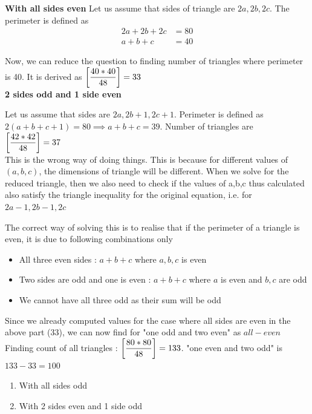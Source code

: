\textbf{With all sides even}
Let us assume that sides of triangle are $2a,2b,2c$. The perimeter is defined as
\begin{align*}
    2a + 2b + 2c &= 80 \\
    a + b + c &= 40
\end{align*}

Now, we can reduce the question to finding number of triangles where perimeter is 40. It is derived as $\left [ \dfrac{40 * 40}{48} \right ] = 33$ \\

\textbf{2 sides odd and 1 side even}

\begin{WARNING}
    Let us assume that sides are $2a,2b+1,2c+1$. Perimeter is defined as $2(a+b+c+1) = 80 \implies a+b+c = 39$. Number of triangles are $\left [ \dfrac{42 * 42}{48} \right ] = 37$ \\

    This is the wrong way of doing things. This is because for different values of $(a,b,c)$, the dimensions of triangle will be different. When we solve for the reduced triangle, then we also need to check if the values of a,b,c thus calculated also satisfy the triangle inequality for the original equation, i.e. for $2a-1, 2b-1, 2c$
\end{WARNING}

The correct way of solving this is to realise that if the perimeter of a triangle is even, it is due to following combinations only
\begin{itemize}
    \item All three even sides : $a + b + c$ where $a,b,c$ is even
    \item Two sides are odd and one is even : $a + b +c$ where $a$ is even and $b,c$ are odd
    \item We cannot have all three odd as their sum will be odd
\end{itemize}

Since we already computed values for the case where all sides are even in the above part (33), we can now find for "one odd and two even" as $all - even$ \\

Finding count of all triangles : $\left [ \dfrac{80 * 80}{48} \right ] = 133$. "one even and two odd" is $133 - 33 = 100$

\begin{enumerate}
    \item With all sides odd
    \item With 2 sides even and 1 side odd
\end{enumerate}

